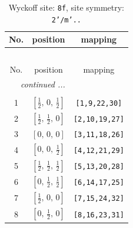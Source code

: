 \documentclass[fleqn,8pt]{jsarticle}
\begin{document}
\begin{longtable}{ccc}
\caption{Wyckoff site: {\tt 8f}, site symmetry: {\tt 2'/m'..}}
 \\
 \hline \hline
No. & position & mapping \\ \hline \endfirsthead

\multicolumn{2}{l}{\tablename\ \thetable{}} \\
 \hline \hline
No. & position & mapping \\ \hline \endhead

 \hline \hline
\multicolumn{2}{r}{\footnotesize\it continued ...} \\ \endfoot

 \hline \hline
\multicolumn{2}{r}{} \\ \endlastfoot

1 & $\left[ \frac{1}{2},\, 0,\, \frac{1}{2} \right]$ & {\tt [1,9,22,30]} \\ \hline
2 & $\left[ \frac{1}{2},\, \frac{1}{2},\, 0 \right]$ & {\tt [2,10,19,27]} \\ \hline
3 & $\left[ 0,\, 0,\, 0 \right]$ & {\tt [3,11,18,26]} \\ \hline
4 & $\left[ 0,\, 0,\, \frac{1}{2} \right]$ & {\tt [4,12,21,29]} \\ \hline
5 & $\left[ \frac{1}{2},\, \frac{1}{2},\, \frac{1}{2} \right]$ & {\tt [5,13,20,28]} \\ \hline
6 & $\left[ 0,\, \frac{1}{2},\, \frac{1}{2} \right]$ & {\tt [6,14,17,25]} \\ \hline
7 & $\left[ \frac{1}{2},\, 0,\, 0 \right]$ & {\tt [7,15,24,32]} \\ \hline
8 & $\left[ 0,\, \frac{1}{2},\, 0 \right]$ & {\tt [8,16,23,31]} \\
\end{longtable}
\renewcommand{\arraystretch}{1.2}
\end{document}
